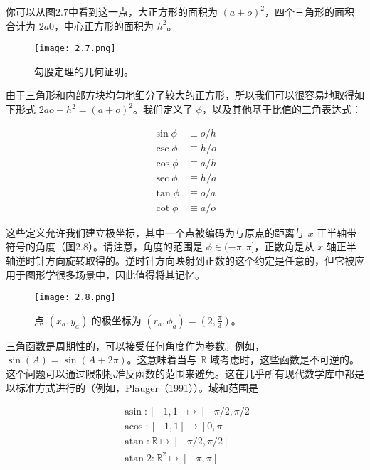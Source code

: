 \documentclass[lang=cn,12pt]{elegantbook}
\begin{document}
你可以从图2.7中看到这一点，大正方形的面积为 $(a+o)^2$，四个三角形的面积合计为 $2a0$，中心正方形的面积为 $h^2$。


\begin{figure}[htbp]
\centering
\texttt{[image: 2.7.png]}
\caption{勾股定理的几何证明。}
\end{figure}

由于三角形和内部方块均匀地细分了较大的正方形，所以我们可以很容易地取得如下形式 $2ao+h^2=(a+o)^2$。我们定义了 $\phi$，以及其他基于比值的三角表达式：

$$
\begin{aligned}
\sin \phi & \equiv o / h \\
\csc \phi & \equiv h / o \\
\cos \phi & \equiv a / h \\
\sec \phi & \equiv h / a \\
\tan \phi & \equiv o / a \\
\cot \phi & \equiv a / o
\end{aligned}
$$

这些定义允许我们建立极坐标，其中一个点被编码为与原点的距离与 $x$ 正半轴带符号的角度（图2.8）。请注意，角度的范围是 $\phi\in(-\pi,\pi]$，正数角是从 $x$ 轴正半轴逆时针方向旋转取得的。逆时针方向映射到正数的这个约定是任意的，但它被应用于图形学很多场景中，因此值得将其记忆。

\begin{figure}[htbp]
\centering
\texttt{[image: 2.8.png]}
\caption{点 $(x_a,y_a)$ 的极坐标为 $(r_a,\phi_a)=(2,\frac{\pi}{3})$。}
\end{figure}

三角函数是周期性的，可以接受任何角度作为参数。例如，$\sin(A) = \sin(A + 2\pi)$。这意味着当与 $\mathbb{R}$ 域考虑时，这些函数是不可逆的。这个问题可以通过限制标准反函数的范围来避免。这在几乎所有现代数学库中都是以标准方式进行的（例如，Plauger（1991））。域和范围是

\begin{equation}
\begin{aligned}
&\operatorname{asin}:[-1,1] \mapsto[-\pi / 2, \pi / 2] \\
&\operatorname{acos}:[-1,1] \mapsto[0, \pi] \\
&\operatorname{atan}: \mathbb{R} \mapsto[-\pi / 2, \pi / 2] \\
&\operatorname{atan} 2: \mathbb{R}^{2} \mapsto[-\pi, \pi]
\end{aligned}
\end{equation}
\end{document}
